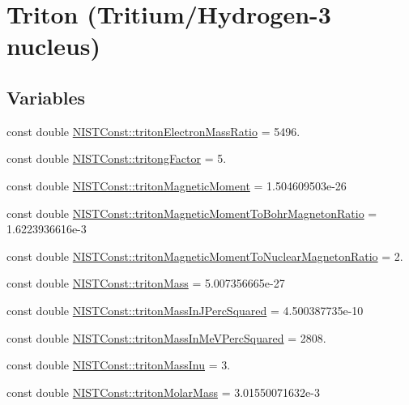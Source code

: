 \hypertarget{group___n_i_s_t_const-_triton}{}\section{Triton (Tritium/\+Hydrogen-\/3 nucleus)}
\label{group___n_i_s_t_const-_triton}
\subsection*{Variables}
\begin{DoxyCompactItemize}
\item 
const double \hyperlink{group___n_i_s_t_const-_triton_ga8508adabd4d9f81969eeed5838a61443}{N\+I\+S\+T\+Const\+::triton\+Electron\+Mass\+Ratio} = 5496.
\item 
const double \hyperlink{group___n_i_s_t_const-_triton_ga4d9812975c185048a8367d9838b53215}{N\+I\+S\+T\+Const\+::tritong\+Factor} = 5.
\item 
const double \hyperlink{group___n_i_s_t_const-_triton_ga9b4063b3a2a14f1ad4718d844f37652e}{N\+I\+S\+T\+Const\+::triton\+Magnetic\+Moment} = 1.\+504609503e-\/26
\item 
const double \hyperlink{group___n_i_s_t_const-_triton_gaab82c511ed065cbe7b02fd089921cab8}{N\+I\+S\+T\+Const\+::triton\+Magnetic\+Moment\+To\+Bohr\+Magneton\+Ratio} = 1.\+6223936616e-\/3
\item 
const double \hyperlink{group___n_i_s_t_const-_triton_ga8d3bbca7115a62873fc804963498fad9}{N\+I\+S\+T\+Const\+::triton\+Magnetic\+Moment\+To\+Nuclear\+Magneton\+Ratio} = 2.
\item 
const double \hyperlink{group___n_i_s_t_const-_triton_ga78c58207fecfdd47e76ce929d9698f0a}{N\+I\+S\+T\+Const\+::triton\+Mass} = 5.\+007356665e-\/27
\item 
const double \hyperlink{group___n_i_s_t_const-_triton_gaab87c757f36a9f281a53f667498af694}{N\+I\+S\+T\+Const\+::triton\+Mass\+In\+J\+Perc\+Squared} = 4.\+500387735e-\/10
\item 
const double \hyperlink{group___n_i_s_t_const-_triton_ga70facf264a59ae4d4f3b67b02fe9bb1a}{N\+I\+S\+T\+Const\+::triton\+Mass\+In\+Me\+V\+Perc\+Squared} = 2808.
\item 
const double \hyperlink{group___n_i_s_t_const-_triton_gad1ea3191cc1092390e96267e7e2e97b3}{N\+I\+S\+T\+Const\+::triton\+Mass\+Inu} = 3.
\item 
const double \hyperlink{group___n_i_s_t_const-_triton_gab22c798216b8f6290211f61270b77eb9}{N\+I\+S\+T\+Const\+::triton\+Molar\+Mass} = 3.\+01550071632e-\/3

\end{DoxyCompactItemize}
